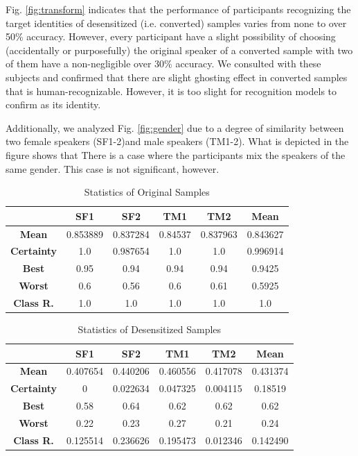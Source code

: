 \documentclass[journal]{IEEEtran} %
\begin{document}
Fig. \ref{fig:transform} indicates that the performance of participants recognizing the target identities of desensitized (i.e. converted) samples varies from none to over 50\% accuracy. However, every participant have a slight possibility of choosing (accidentally or purposefully) the original speaker of a converted sample with two of them have a non-negligible over 30\% accuracy. We consulted with these subjects and confirmed that there are slight ghosting effect in converted samples that is human-recognizable. However, it is too slight for recognition models to confirm as its identity.

Additionally, we analyzed Fig. \ref{fig:gender} due to a degree of similarity between two female speakers (SF1-2)and male speakers (TM1-2). What is depicted in the figure shows that There is a case where the participants mix the speakers of the same gender. This case is not significant, however.

\begin{table}[htbp]
    \centering
    \caption{Statistics of Original Samples}
    \begin{tabular}{|c|c|c|c|c|c|}
        \hline
        & \textbf{SF1} & \textbf{SF2} & \textbf{TM1} & \textbf{TM2} & \textbf{Mean} \\
        \hline
        \textbf{Mean} & 0.853889 & 0.837284 & 0.84537 & 0.837963 & 0.843627 \\
        \hline
        \textbf{Certainty} & 1.0 & 0.987654 & 1.0 & 1.0 & 0.996914 \\
        \hline
        \textbf{Best} & 0.95 & 0.94 & 0.94 & 0.94 & 0.9425\\
        \hline
        \textbf{Worst} & 0.6 & 0.56 & 0.6 & 0.61 & 0.5925\\
        \hline
        \textbf{Class R.} & 1.0 & 1.0 & 1.0 & 1.0 & 1.0\\
        \hline
    \end{tabular}
    \label{tab:st_org}
\end{table}

\begin{table}[htbp]
    \centering
    \caption{Statistics of Desensitized Samples}
    \begin{tabular}{|c|c|c|c|c|c|}
        \hline
        & \textbf{SF1} & \textbf{SF2} & \textbf{TM1} & \textbf{TM2} & \textbf{Mean} \\
        \hline
        \textbf{Mean} & 0.407654 & 0.440206 & 0.460556 & 0.417078 & 0.431374 \\
        \hline
        \textbf{Certainty} & 0 & 0.022634 & 0.047325 & 0.004115 & 0.18519 \\
        \hline
        \textbf{Best} & 0.58 & 0.64 & 0.62 & 0.62 & 0.62 \\
        \hline
        \textbf{Worst} & 0.22 & 0.23 & 0.27 & 0.21 & 0.24 \\
        \hline
        \textbf{Class R.} & 0.125514 & 0.236626 & 0.195473 & 0.012346 & 0.142490 \\
        \hline
    \end{tabular}
    \label{tab:st_des}
\end{table}
\end{document}
